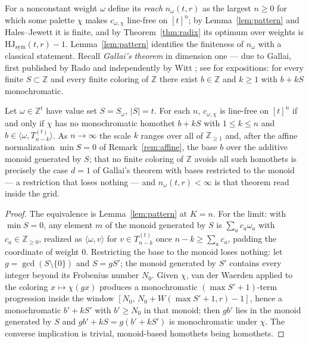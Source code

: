 \documentclass[12pt]{article}
\newcommand{\HJ}{\mathrm{HJ}}
\newcommand{\Wvdw}{W}
\newcommand{\Z}{\mathbb{Z}}
\begin{document}
For a nonconstant weight $\omega$ define its \emph{reach}
$n_{\omega}(t,r)$ as the largest $n\ge 0$ for which some palette $\chi$
makes $c_{\omega,\chi}$ line-free on $[t]^{n}$; by
Lemma~\ref{lem:pattern} and Hales--Jewett it is finite, and by
Theorem~\ref{thm:radix} its optimum over weights is
$\HJ_{\mathrm{sym}}(t,r)-1$. Lemma~\ref{lem:pattern} identifies the
finiteness of $n_{\omega}$ with a classical statement. Recall
\emph{Gallai's theorem} in dimension one --- due to Gallai, first
published by Rado \cite{Rado1933} and independently by Witt
\cite{Witt1952}; see \cite{hans,LandmanRobertson} for expositions: for
every finite $S\subset\Z$ and every finite coloring of $\Z$ there exist
$b\in\Z$ and $k\ge 1$ with $b+kS$ monochromatic.

\begin{theorem}\label{thm:gallai-form}
Let $\omega\in\Z^{t}$ have value set $S=S_{\omega}$, $|S|=t$. For each
$n$, $c_{\omega,\chi}$ is line-free on $[t]^{n}$ if and only if $\chi$
has no monochromatic homothet $b+kS$ with $1\le k\le n$ and
$b\in\langle\omega,T_{n-k}^{(t)}\rangle$. As $n\to\infty$ the scale $k$
ranges over all of $\Z_{\ge 1}$ and, after the affine normalization
$\min S=0$ of Remark~\ref{rem:affine}, the base $b$ over the additive
monoid generated by $S$; that no finite coloring of $\Z$ avoids all
such homothets is precisely the case $d=1$ of Gallai's theorem with
bases restricted to the monoid --- a restriction that loses nothing ---
and $n_{\omega}(t,r)<\infty$ is that theorem read inside the grid.
\end{theorem}

\begin{proof}
The equivalence is Lemma~\ref{lem:pattern} at $K=n$. For the limit:
with $\min S=0$, any element $m$ of the monoid generated by $S$ is
$\sum_{a}c_{a}\omega_{a}$ with $c_{a}\in\Z_{\ge 0}$, realized as
$\langle\omega,v\rangle$ for $v\in T_{n-k}^{(t)}$ once
$n-k\ge\sum_{a}c_{a}$, padding the coordinate of weight $0$.
Restricting the base to the monoid loses nothing: let
$g=\gcd(S\setminus\{0\})$ and $S=gS'$; the monoid generated by $S'$
contains every integer beyond its Frobenius number $N_{0}$. Given
$\chi$, van der Waerden applied to the coloring $x\mapsto\chi(gx)$
produces a monochromatic $(\max S'+1)$-term progression inside the
window $[N_{0},\,N_{0}+\Wvdw(\max S'+1,r)-1]$, hence a monochromatic
$b'+kS'$ with $b'\ge N_{0}$ in that monoid; then $gb'$ lies in the
monoid generated by $S$ and $gb'+kS=g(b'+kS')$ is monochromatic under
$\chi$. The converse implication is trivial, monoid-based homothets
being homothets.
\end{proof}
\end{document}
